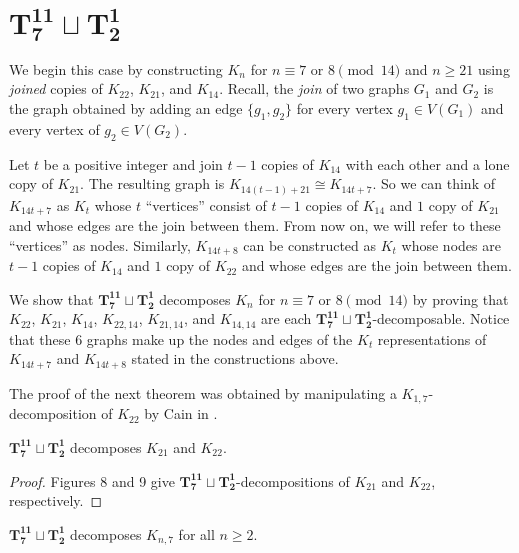 \chapter{$\mathbf{T_{7}^{11}\sqcup T_{2}^{1}}$} \label{chap:special case}
We begin this case by constructing $K_{n}$ for $n \equiv 7 \textrm{ or } 8 \pmod{14}$ and $n\geq 21$ using \textit{joined} copies of $K_{22}$, $K_{21}$, and $K_{14}$. Recall, the \textit{join} of two graphs $G_{1}$ and $G_{2}$ is the graph obtained by adding an edge $\{g_1,g_2\}$ for every vertex $g_1 \in V(G_{1})$ and every vertex of $g_2 \in V(G_{2})$.

Let $t$ be a positive integer and join $t-1$ copies of $K_{14}$ with each other and a lone copy of $K_{21}$. The resulting graph is $K_{14(t-1)+21} \cong K_{14t+7}$. So we can think of $K_{14t+7}$ as $K_{t}$ whose $t$ ``vertices'' consist of $t-1$ copies of $K_{14}$ and $1$ copy of $K_{21}$ and whose edges are the join between them. From now on, we will refer to these ``vertices'' as nodes. Similarly, $K_{14t+8}$ can be constructed as $K_{t}$ whose nodes are $t-1$ copies of $K_{14}$ and $1$ copy of $K_{22}$ and whose edges are the join between them.

We show that $\mathbf{T_{7}^{11}}\sqcup\mathbf{T_{2}^{1}}$ decomposes $K_{n}$ for $n\equiv7 \textrm{ or }8\pmod{14}$ by proving that $K_{22}$, $K_{21}$, $K_{14}$, $K_{22,14}$, $K_{21,14}$, and $K_{14,14}$ are each $\mathbf{T_{7}^{11}}\sqcup\mathbf{T_{2}^{1}}$-decomposable. Notice that these 6 graphs make up the nodes and edges of the $K_{t}$ representations of $K_{14t+7}$ and $K_{14t+8}$ stated in the constructions above.

\noindent The proof of the next theorem was obtained by manipulating a $K_{1,7}$-decomposition of $K_{22}$ by Cain in \cite{bib:Cain}.

\begin{thm}\label{thm:PCstarpath}
    $\mathbf{T_{7}^{11}}\sqcup\mathbf{T_{2}^{1}}$ decomposes $K_{21}$ and $K_{22}$.
\end{thm}

\begin{proof}
     Figures 8 and 9 give $\mathbf{T_{7}^{11}}\sqcup\mathbf{T_{2}^{1}}$-decompositions of $K_{21}$ and $K_{22}$, respectively.%
\end{proof}
\newpage
\begin{thm} \label{thm:K_n,7}
    $\mathbf{T_{7}^{11}}\sqcup\mathbf{T_{2}^{1}}$ decomposes $K_{n,7}$ for all $n\geq 2$.
\end{thm}

